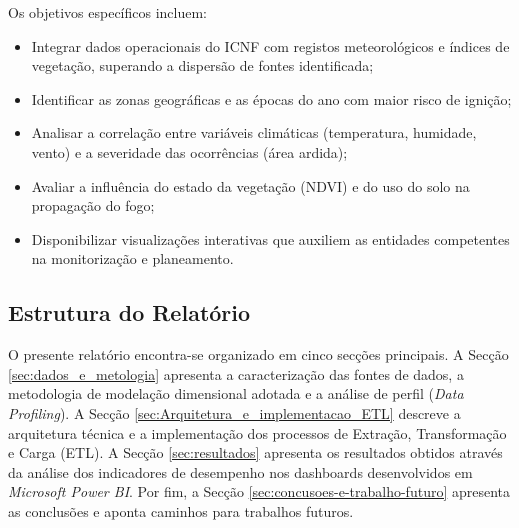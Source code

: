 Os objetivos específicos incluem:
\begin{itemize}
	\item Integrar dados operacionais do ICNF com registos meteorológicos e índices de vegetação, superando a dispersão de fontes identificada;
	\item Identificar as zonas geográficas e as épocas do ano com maior risco de ignição;
	\item Analisar a correlação entre variáveis climáticas (temperatura, humidade, vento) e a severidade das ocorrências (área ardida);
	\item Avaliar a influência do estado da vegetação (NDVI) e do uso do solo na propagação do fogo;
	\item Disponibilizar visualizações interativas que auxiliem as entidades competentes na monitorização e planeamento.
\end{itemize}

\subsection{Estrutura do Relatório}
O presente relatório encontra-se organizado em cinco secções principais. A Secção \ref{sec:dados_e_metologia} apresenta a caracterização das fontes de dados, a metodologia de modelação dimensional adotada e a análise de perfil (\textit{Data Profiling}). A Secção \ref{sec:Arquitetura_e_implementacao_ETL} descreve a arquitetura técnica e a implementação dos processos de Extração, Transformação e Carga (ETL). A Secção \ref{sec:resultados} apresenta os resultados obtidos através da análise dos indicadores de desempenho nos dashboards desenvolvidos em \textit{Microsoft Power BI}. Por fim, a Secção \ref{sec:concusoes-e-trabalho-futuro} apresenta as conclusões e aponta caminhos para trabalhos futuros.